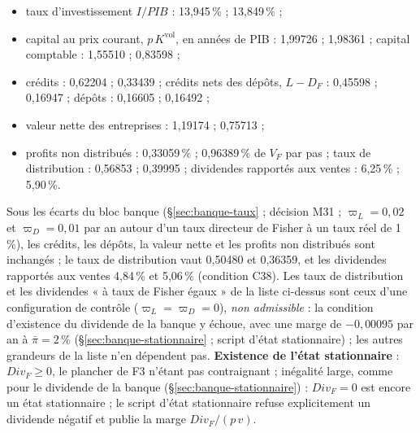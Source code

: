 \documentclass[11pt,a4paper]{article}
\begin{document}
\begin{proposee}
\begin{itemize}
\item taux d'investissement $I/\mathit{PIB}$ : 13,945\,\% ; 13,849\,\% ;
\item capital au prix courant, $p\,K^{\mathrm{vol}}$, en années de PIB : 1,99726 ; 1,98361 ; capital comptable : 1,55510 ; 0,83598 ;
\item crédits : 0,62204 ; 0,33439 ; crédits nets des dépôts, $L - D_F$ : 0,45598 ; 0,16947 ; dépôts : 0,16605 ; 0,16492 ;
\item valeur nette des entreprises : 1,19174 ; 0,75713 ;
\item profits non distribués : 0,33059\,\% ; 0,96389\,\% de $V_F$ par pas ; taux de distribution : 0,56853 ; 0,39995 ; dividendes rapportés aux ventes : 6,25\,\% ; 5,90\,\%.
\end{itemize}
Sous les écarts du bloc banque (\S\ref{sec:banque-taux} ; décision M31 ; $\varpi_L = 0{,}02$ et $\varpi_D = 0{,}01$ par an autour d'un taux directeur de Fisher à un taux réel de 1\,\%), les crédits, les dépôts, la valeur nette et les profits non distribués sont inchangés ; le taux de distribution vaut 0,50480 et 0,36359, et les dividendes rapportés aux ventes 4,84\,\% et 5,06\,\% (condition C38). Les taux de distribution et les dividendes « à taux de Fisher égaux » de la liste ci-dessus sont ceux d'une configuration de contrôle ($\varpi_L = \varpi_D = 0$), \emph{non admissible} : la condition d'existence du dividende de la banque y échoue, avec une marge de $-0{,}00095$ par an à $\bar\pi = 2\,\%$ (\S\ref{sec:banque-stationnaire} ; script d'état stationnaire) ; les autres grandeurs de la liste n'en dépendent pas. \textbf{Existence de l'état stationnaire} : $\mathit{Div}_F \ge 0$, le plancher de F3 n'étant pas contraignant ; inégalité large, comme pour le dividende de la banque (\S\ref{sec:banque-stationnaire}) : $\mathit{Div}_F = 0$ est encore un état stationnaire ; le script d'état stationnaire refuse explicitement un dividende négatif et publie la marge $\mathit{Div}_F/(p\,v)$.

\end{proposee}
\end{document}
